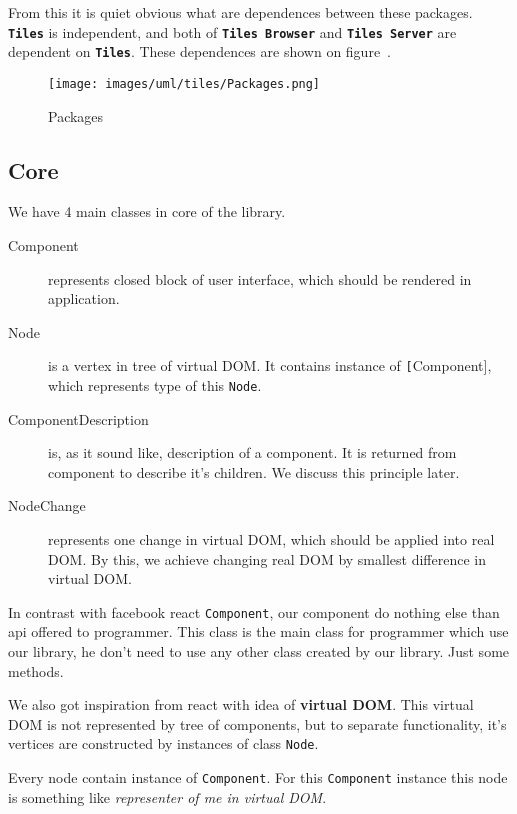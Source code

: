     From this it is quiet obvious what are dependences between these packages. 
    \texttt{\textbf{Tiles}} is independent, and both of \texttt{\textbf{Tiles Browser}} and \texttt{\textbf{Tiles Server}} are dependent on \texttt{\textbf{Tiles}}.
    These dependences are shown on figure~.

    \begin{figure}[h]
    \centering  
      \texttt{[image: images/uml/tiles/Packages.png]}
      \caption{Packages}
      \label{img:library-packages}
    \end{figure}

  \subsection{Core}\label{subsec:our-architecture-core}
    We have 4 main classes in core of the library.
    \begin{description}
      \item[Component] 
        represents closed block of user interface, which should be rendered in application.
      \item[Node]
        is a vertex in tree of virtual DOM. It contains instance of \texttt[Component], which represents type of this \texttt{Node}.
      \item[ComponentDescription]
        is, as it sound like, description of a component. It is returned from component to describe it's children. We discuss this principle later.
      \item[NodeChange]
        represents one change in virtual DOM, which should be applied into real DOM. By this, we achieve changing real DOM by smallest difference in virtual DOM. 
    \end{description}

    In contrast with facebook react \texttt{Component}, our component do nothing else than api offered to programmer.
    This class is the main class for programmer which use our library, he don't need to use any other class created by our library. 
    Just some methods.

    We also got inspiration from react with idea of \textbf{virtual DOM}. 
    This virtual DOM is not represented by tree of components, but to separate functionality, 
    it's vertices are constructed by instances of class \texttt{Node}.

    Every node contain instance of \texttt{Component}. 
    For this \texttt{Component} instance this node is something like \textit{representer of me in virtual DOM}.
    
